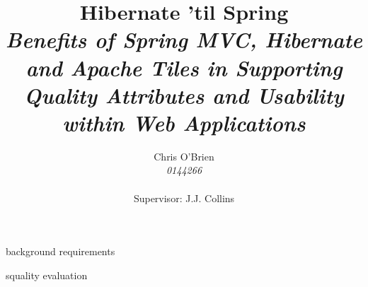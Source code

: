 \documentclass[a4paper,11pt,fleqn]{report}
\begin{document}
\title{Hibernate 'til Spring \\ \textit{Benefits of Spring MVC, Hibernate and Apache Tiles in Supporting Quality Attributes and Usability within Web Applications}}
\author{Chris O'Brien \\ \textit{0144266} \\ \\ Supervisor: J.J. Collins}
\maketitle

\begin{abstract}      

\end{abstract}        

%
%
\tableofcontents

%
%
\listoffigures

%
%
\listoftables


 {background}
 {requirements}


 {squality}
 {evaluation}

\printbibliography[title={References}]
\appendix

\end{document}
